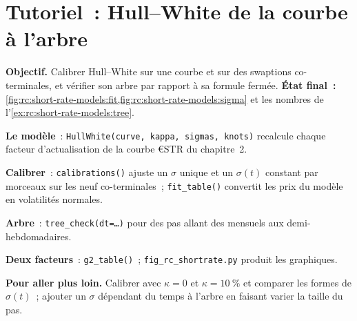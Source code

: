 \begin{omfigure}

\label{fig:rc:short-rate-models:g2}
\end{omfigure}

\section{Tutoriel~: Hull--White de la courbe à l'arbre}\label{tut:rc:short-rate-models:tutorial}

\begin{tutorial}
\textbf{Objectif.} Calibrer Hull--White sur une courbe et sur des swaptions co-terminales, et
vérifier son arbre par rapport à sa formule fermée. \textbf{État final~:}
\cref{fig:rc:short-rate-models:fit,fig:rc:short-rate-models:sigma} et les nombres de
l'\cref{ex:rc:short-rate-models:tree}.
\begin{tutsteps}
\item \textbf{Le modèle}~: \texttt{HullWhite(curve, kappa, sigmas, knots)} recalcule
chaque facteur d'actualisation de la courbe €STR du chapitre~2.
\item \textbf{Calibrer}~: \texttt{calibrations()} ajuste un $\sigma$ unique et un
$\sigma(t)$ constant par morceaux sur les neuf co-terminales~;
\texttt{fit\_table()} convertit les prix du modèle en volatilités normales.
\item \textbf{Arbre}~: \texttt{tree\_check(dt=\ldots)} pour des pas allant des mensuels aux demi-hebdomadaires.
\item \textbf{Deux facteurs}~: \texttt{g2\_table()}~; \texttt{fig\_rc\_shortrate.py}
produit les graphiques.
\end{tutsteps}
\textbf{Pour aller plus loin.} Calibrer avec $\kappa=0$ et $\kappa=10~\%$ et comparer
les formes de $\sigma(t)$~; ajouter un $\sigma$ dépendant du temps à l'arbre en faisant varier
la taille du pas.
\end{tutorial}

